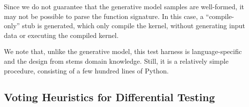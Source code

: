 Since we do not guarantee that the generative model samples are well-formed, it may not be possible to parse the function signature. In this case, a ``compile-only'' stub is generated, which only compile the kernel, without generating input data or executing the compiled kernel.

We note that, unlike the generative model, this test harness is language-specific and the design from stems domain knowledge. Still, it is a relatively simple procedure, consisting of a few hundred lines of Python.





\subsection{Voting Heuristics for Differential Testing}

